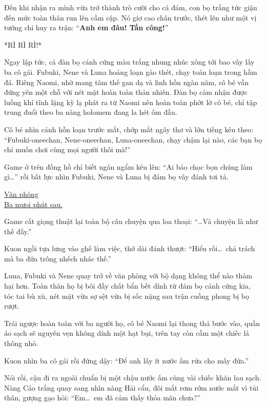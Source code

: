 \documentclass[../main.tex]{subfiles}
\begin{document}
Đến khi nhận ra mình vừa trở thành trò cười cho cả đám, con bọ trắng tức giận đến mức toàn thân run lên cầm cập. Nó giơ cao chân trước, thét lên như một vị tướng chỉ huy ra trận: ``\textbf{Anh em đâu! Tấn công!}''

*RÌ RÌ RÌ!*

Ngay lập tức, cả đàn bọ cánh cứng màu trắng nhung nhúc xông tới bao vây lấy ba cô gái. Fubuki, Nene và Luna hoảng loạn gào thét, chạy toán loạn trong hầm đá. Riêng Naomi, nhờ mang tâm thế gan dạ và linh hồn ngàn năm, cô bé vẫn đứng yên một chỗ với nét mặt hoàn toàn thản nhiên. Đàn bọ cảm nhận được luồng khí tĩnh lặng kỳ lạ phát ra từ Naomi nên hoàn toàn phớt lờ cô bé, chỉ tập trung đuổi theo ba nàng holomem đang la hét ôm đầu.


Cô bé nhìn cảnh hỗn loạn trước mắt, chớp mắt ngây thơ và lớn tiếng kêu theo: ``Fubuki-oneechan, Nene-oneechan, Luna-oneechan, chạy chậm lại nào, các bạn bọ chỉ muốn chơi cùng mọi người thôi mà!''

Game ở trên đồng hồ chỉ biết ngán ngẩm kêu lên: ``Ai bảo chọc bọn chúng làm gì\dots'' rồi bất lực nhìn Fubuki, Nene và Luna bị đám bọ vây đánh tơi tả.

\ct

\begin{center}
  \uline{Văn phòng \hll \\ Ba mưoi phút sau.}
\end{center}

Game cất giọng thuật lại toàn bộ câu chuyện qua loa thoại: ``\dots Và chuyện là như thế đấy.''

Kuon ngồi tựa lưng vào ghế làm việc, thở dài đánh thượt: ``Hiểu rồi\dots\ chả trách mà ba đứa trông nhếch nhác thế.''

Luna, Fubuki và Nene quay trở về văn phòng với bộ dạng không thể nào thảm hại hơn. Toàn thân họ bị bôi đầy chất bẩn bết dính từ đám bọ cánh cứng kia, tóc tai bù xù, nét mặt vừa sợ sệt vừa bị sốc nặng sau trận cuồng phong bị bọ rượt.


Trái ngược hoàn toàn với ba người họ, cô bé Naomi lại thong thả bước vào, quần áo sạch sẽ nguyên vẹn không dính một hạt bụi, trên tay còn cầm một chiếc lá thông nhỏ.

Kuon nhìn ba cô gái rồi đứng dậy: ``Để anh lấy ít nước ấm rửa cho mấy đứa.''

Nói rồi, cậu đi ra ngoài chuẩn bị một chậu nước ấm cùng vài chiếc khăn lau sạch. Nàng Cáo trắng quay sang nhìn nàng Hải cẩu, đôi mắt rơm rớm nước mắt vì tủi thân, gượng gạo hỏi: ``Em\dots\ em đã cảm thấy thỏa mãn chưa?''
\end{document}
